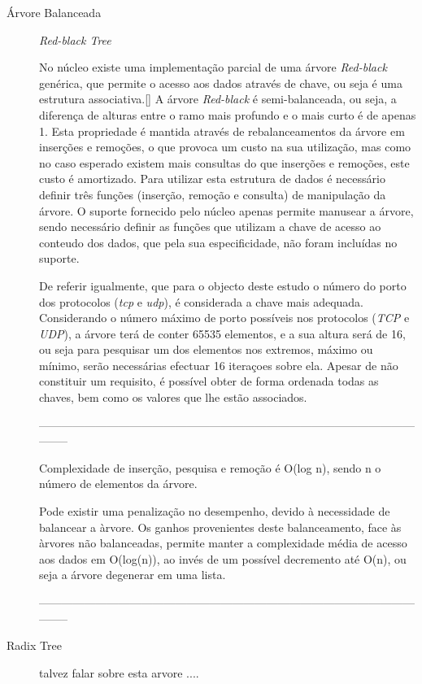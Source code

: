 \begin{description}
\item[Árvore Balanceada]
\textit{Red-black Tree} 

No núcleo existe uma implementação parcial de uma árvore \textit{Red-black} genérica, que permite o acesso aos dados através de chave, ou seja é uma estrutura associativa.\ref{}
A árvore \textit{Red-black} é semi-balanceada, ou seja, a diferença de alturas entre o ramo mais profundo e o mais curto é de apenas 1.
Esta propriedade é mantida através de rebalanceamentos da árvore em inserções e remoções, o que provoca um custo na sua utilização, mas como no caso esperado existem mais consultas do que inserções e remoções, este custo é amortizado.
Para utilizar esta estrutura de dados é necessário definir três funções (inserção, remoção e consulta) de manipulação da árvore.
O suporte fornecido pelo núcleo apenas permite manusear a árvore, sendo necessário definir as funções que utilizam a chave de acesso ao conteudo dos dados, que pela sua especificidade, não foram incluídas no suporte.

De referir igualmente, que para o objecto deste estudo o número do porto dos protocolos (\textit{tcp} e \textit{udp}), é considerada a chave mais adequada.
Considerando o número máximo de porto possíveis nos protocolos (\textit{TCP} e \textit{UDP}), a árvore terá de conter 65535 elementos, e a sua altura será de 16, ou seja para pesquisar um dos elementos nos extremos, máximo ou mínimo, serão necessárias efectuar 16 iteraçoes sobre ela.
Apesar de não constituir um requisito, é possível obter de forma ordenada todas as chaves, bem como os valores que lhe estão associados.

-----------------------------------------------------------------------------------------------------------

Complexidade de inserção, pesquisa e remoção é O(log n), sendo n o número de elementos da árvore.

Pode existir uma penalização no desempenho, devido à necessidade de balancear a àrvore.
Os ganhos provenientes deste balanceamento, face às àrvores não balanceadas, permite manter a complexidade média de acesso aos dados em O(log(n)), ao invés de um possível decremento até O(n), ou seja a árvore degenerar em uma lista.

-----------------------------------------------------------------------------------------------------------

\item[Radix Tree]
talvez falar sobre esta arvore ....

\end{description}

